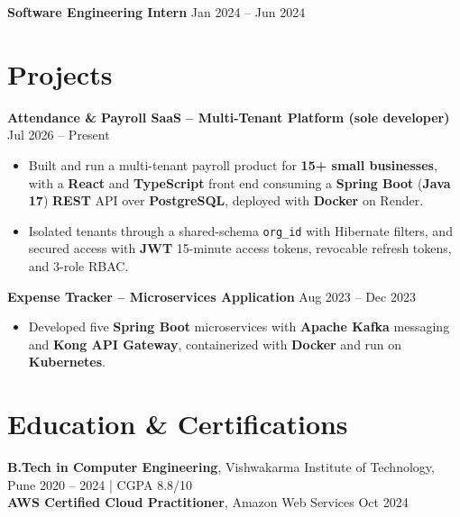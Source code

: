 \documentclass[a4paper,10pt]{article}
\begin{document}
\textbf{Software Engineering Intern} \hfill Jan 2024 -- Jun 2024

\section*{Projects}

\textbf{Attendance \& Payroll SaaS -- Multi-Tenant Platform (sole developer)} \hfill Jul 2026 -- Present
\begin{itemize}[leftmargin=*]
    \item Built and run a multi-tenant payroll product for \textbf{15+ small businesses}, with a \textbf{React} and \textbf{TypeScript} front end consuming a \textbf{Spring Boot} (\textbf{Java 17}) \textbf{REST} API over \textbf{PostgreSQL}, deployed with \textbf{Docker} on Render.
    \item Isolated tenants through a shared-schema \texttt{org\_id} with Hibernate filters, and secured access with \textbf{JWT} 15-minute access tokens, revocable refresh tokens, and 3-role RBAC.
\end{itemize}

\textbf{Expense Tracker -- Microservices Application} \hfill Aug 2023 -- Dec 2023
\begin{itemize}[leftmargin=*]
    \item Developed five \textbf{Spring Boot} microservices with \textbf{Apache Kafka} messaging and \textbf{Kong API Gateway}, containerized with \textbf{Docker} and run on \textbf{Kubernetes}.
\end{itemize}

\section*{Education \& Certifications}
\textbf{B.Tech in Computer Engineering}, Vishwakarma Institute of Technology, Pune \hfill 2020 -- 2024 \;|\; CGPA 8.8/10 \\
\textbf{AWS Certified Cloud Practitioner}, Amazon Web Services \hfill Oct 2024
\end{document}
